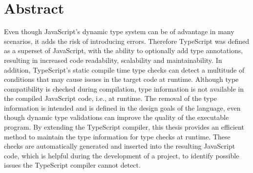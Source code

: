 \chapter{Abstract}

Even though JavaScript's dynamic type system can be of advantage in many scenarios, it adds the risk of introducing errors. Therefore TypeScript was defined as a superset of JavaScript, with the ability to optionally add type annotations, resulting in increased code readability, scalability and maintainability. In addition, TypeScript's static compile time type checks can detect a multitude of conditions that may cause issues in the target code at runtime. Although type compatibility is checked during compilation, type information is not available in the compiled JavaScript code, i.e., at runtime. The removal of the type information is intended and is defined in the design goals of the language, even though dynamic type validations can improve the quality of the executable program. By extending the TypeScript compiler, this thesis provides an efficient method to maintain the type information for type checks at runtime. These checks are automatically generated and inserted into the resulting JavaScript code, which is helpful during the development of a project, to identify possible issues the TypeScript compiler cannot detect.
